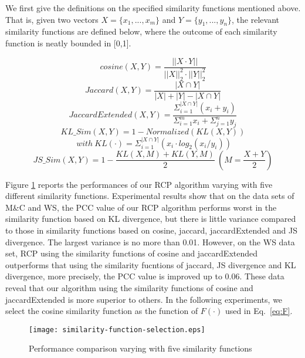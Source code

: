 We first give the definitions on the specified similarity functions mentioned above. That is, given two vectors $X = \{x_1, ...,x_m\}$ and $Y=\{y_1,...,y_n\}$, the relevant similarity functions are defined below, where the outcome of each similarity function is neatly bounded in [0,1].

$$cosine(X,Y) = \frac{||X\cdot Y||}{||X||_2^2\cdot ||Y||_2^2}$$
$$Jaccard(X,Y) = \frac{|X\cap Y|}{|X|+|Y|-|X\cap Y|}$$
$$JaccardExtended(X,Y) = \frac{\Sigma_{i=1}^{|X\cap Y|}(x_i+y_i)}{\Sigma_{i=1}^mx_i+\Sigma_{j=1}^ny_j}$$
$$KL\_Sim(X,Y) = 1-Normalized(KL(X,Y))$$
$$~with~KL(\cdot)=\Sigma_{i=1}^{|X\cap Y|}(x_i\cdot log_2(x_i/y_i))$$
$$JS\_Sim(X,Y) = 1-\frac{KL(X,M) + KL(Y, M)}{2} ~(M = \frac{X+Y}{2})$$

Figure \ref{fig:F} reports the performances of our RCP algorithm varying with five different similarity functions. Experimental results show that on the data sets of M\&C and WS, the PCC value of our RCP algorithm performs worst in the similarity function based on KL divergence, but there is little variance compared to those in similarity functions based on cosine, jaccard, jaccardExtended and JS divergence. The largest variance is no more than 0.01. However, on the WS data set, RCP using the similarity functions of cosine and jaccardExtended outperforms that using the similarity fucntions of jaccard, JS divergence and KL divergence, more precisely, the PCC value is improved up to 0.06. These data reveal that our algorithm using the similarity functions of cosine and jaccardExtended is more superior to others. In the following experiments, we select the cosine similarity function as the function of $F(\cdot)$ used in Eq.~\ref{eq:F}.

\begin{figure}[!t]
 \centerline{
 \texttt{[image: similarity-function-selection.eps]}}
 \caption{Performance comparison varying with five similarity functions}
 \label{fig:F}
\end{figure}

